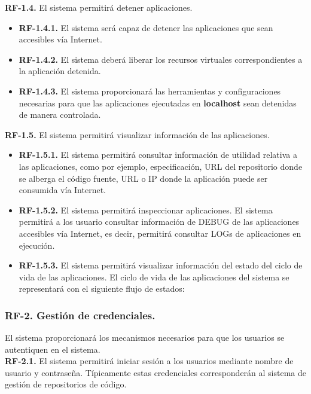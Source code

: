 \documentclass[a4paper,11pt]{book}
\begin{document}
\textbf{RF-1.4.} El sistema permitirá detener aplicaciones.

\begin{itemize}
 \item  \textbf{RF-1.4.1.} El sistema será capaz de detener las aplicaciones que sean accesibles vía Internet.
  \item  \textbf{RF-1.4.2.} El sistema deberá liberar los recursos virtuales correspondientes a la aplicación detenida.
  \item  \textbf{RF-1.4.3.} El sistema proporcionará las herramientas  y configuraciones necesarias para que las aplicaciones ejecutadas en \textbf{localhost}  sean detenidas de manera controlada. \\
\end{itemize}

\textbf{RF-1.5.} El sistema permitirá visualizar información de las aplicaciones.

\begin{itemize}
\item \textbf{RF-1.5.1.} El sistema permitirá consultar  información de utilidad relativa a las aplicaciones,  como por ejemplo, especificación, URL del repositorio donde se alberga el código fuente, URL o IP donde la aplicación puede ser consumida vía Internet.
\item \textbf{RF-1.5.2.} El sistema permitirá inspeccionar aplicaciones. El sistema permitirá a los usuario consultar información de DEBUG de las aplicaciones accesibles vía Internet, es decir, permitirá consultar LOGs de aplicaciones en ejecución.
\item \textbf{RF-1.5.3.} El sistema permitirá visualizar información del estado del ciclo de vida de las aplicaciones. El ciclo de vida de las aplicaciones del sistema se representará con el siguiente flujo de estados:\\
\end{itemize}


\subsubsection { \textbf{ RF-2. Gestión de credenciales.}} El sistema proporcionará los mecanismos necesarios para que los usuarios se autentiquen en el sistema. \\


\textbf{RF-2.1.} El sistema  permitirá iniciar sesión  a los usuarios mediante nombre de usuario y contraseña. Típicamente estas credenciales corresponderán al sistema de gestión de repositorios de código.
\end{document}
